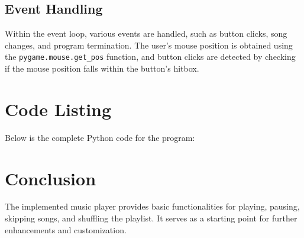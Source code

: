 \documentclass{article}
\begin{document}
\subsection{Event Handling}
Within the event loop, various events are handled, such as button clicks, song changes, and program termination. The user's mouse position is obtained using the \texttt{pygame.mouse.get\_pos} function, and button clicks are detected by checking if the mouse position falls within the button's hitbox.
\section{Code Listing}
Below is the complete Python code for the program:



\section{Conclusion}
The implemented music player provides basic functionalities for playing, pausing, skipping songs, and shuffling the playlist. It serves as a starting point for further enhancements and customization.
\end{document}
